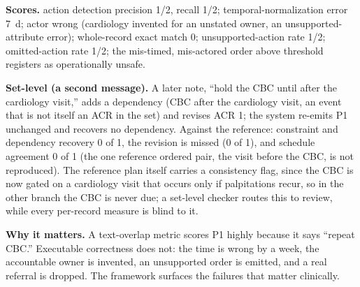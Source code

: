 \textbf{Scores.} action detection precision 1/2, recall 1/2; temporal-normalization error 7~d; actor wrong (cardiology invented for an unstated owner, an unsupported-attribute error); whole-record exact match 0; unsupported-action rate 1/2; omitted-action rate 1/2; the mis-timed, mis-actored order above threshold registers as operationally unsafe.

\textbf{Set-level (a second message).} A later note, ``hold the CBC until after the cardiology visit,'' adds a dependency (CBC after the cardiology visit, an event that is not itself an ACR in the set) and revises ACR 1; the system re-emits P1 unchanged and recovers no dependency. Against the reference: constraint and dependency recovery 0 of 1, the revision is missed (0 of 1), and schedule agreement 0 of 1 (the one reference ordered pair, the visit before the CBC, is not reproduced). The reference plan itself carries a consistency flag, since the CBC is now gated on a cardiology visit that occurs only if palpitations recur, so in the other branch the CBC is never due; a set-level checker routes this to review, while every per-record measure is blind to it.

\textbf{Why it matters.} A text-overlap metric scores P1 highly because it says ``repeat CBC.'' Executable correctness does not: the time is wrong by a week, the accountable owner is invented, an unsupported order is emitted, and a real referral is dropped. The framework surfaces the failures that matter clinically.

